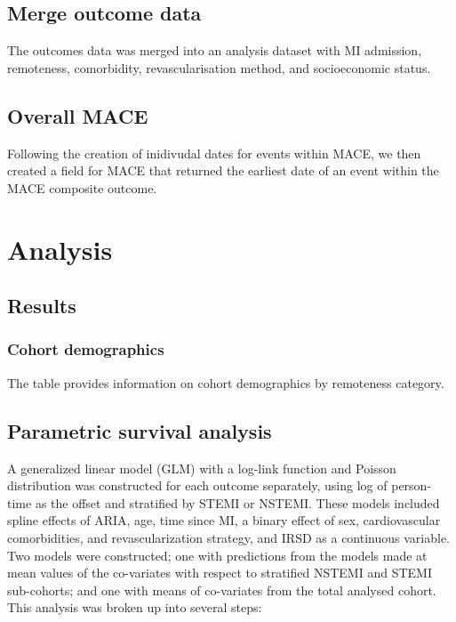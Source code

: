 \documentclass[11pt]{article}
\begin{document}
\subsection{Merge outcome data}
The outcomes data was merged into an analysis dataset with MI admission, remoteness, comorbidity, revascularisation method, and socioeconomic status. 
\color{violet}
\begin{stlog}\end{stlog}
\color{black}
\subsection{Overall MACE}
Following the creation of inidivudal dates for events within MACE, we then created a field for MACE that returned the earliest date of an event within the MACE composite outcome. 
\color{violet}
\begin{stlog}\end{stlog}
\color{black}
\section{Analysis}
\subsection{Results}
\subsubsection{Cohort demographics}
The table provides information on cohort demographics by remoteness category. 
\color{violet}
\begin{stlog}\end{stlog}
\color{black}
\subsection{Parametric survival analysis}
A generalized linear model (GLM) with a log-link function and Poisson distribution was constructed for each outcome separately, using log of person-time as the offset and stratified by STEMI or NSTEMI. These models included spline effects of ARIA, age, time since MI, a binary effect of sex, cardiovascular comorbidities, and revascularization strategy, and IRSD as a continuous variable. Two models were constructed; one with predictions from the models made at mean values of the co-variates with respect to stratified NSTEMI and STEMI sub-cohorts; and one with means of co-variates from the total analysed cohort.\\
This analysis was broken up into several steps:\\
\end{document}
